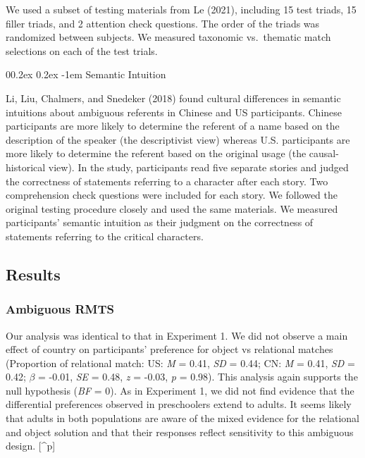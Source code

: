 \documentclass[
  man]{apa6}
\makeatletter
\let\oldparagraph\paragraph
\renewcommand{\paragraph}[1]{\oldparagraph{#1}\mbox{}}
\renewcommand{\paragraph}{\@startsection{paragraph}{4}{\parindent}%
  {0\baselineskip \@plus 0.2ex \@minus 0.2ex}%
  {-1em}%
  {\normalfont\normalsize\bfseries\itshape\typesectitle}}
\makeatother
\begin{document}
We used a subset of testing materials from Le (2021), including 15 test triads, 15 filler triads, and 2 attention check questions. The order of the triads was randomized between subjects. We measured taxonomic vs.~thematic match selections on each of the test trials.

\hypertarget{semantic-intuition}{%
\paragraph{Semantic Intuition}\label{semantic-intuition}}

Li, Liu, Chalmers, and Snedeker (2018) found cultural differences in semantic intuitions about ambiguous referents in Chinese and US participants. Chinese participants are more likely to determine the referent of a name based on the description of the speaker (the descriptivist view) whereas U.S. participants are more likely to determine the referent based on the original usage (the causal-historical view). In the study, participants read five separate stories and judged the correctness of statements referring to a character after each story. Two comprehension check questions were included for each story. We followed the original testing procedure closely and used the same materials. We measured participants' semantic intuition as their judgment on the correctness of statements referring to the critical characters.

\hypertarget{results-1}{%
\subsection{Results}\label{results-1}}

\hypertarget{ambiguous-rmts}{%
\subsubsection{Ambiguous RMTS}\label{ambiguous-rmts}}

Our analysis was identical to that in Experiment 1. We did not observe a main effect of country on participants' preference for object vs relational matches (Proportion of relational match: US: \emph{M} = 0.41, \emph{SD} = 0.44; CN: \emph{M} = 0.41, \emph{SD} = 0.42; \(\beta\) = -0.01, \emph{SE} = 0.48, \emph{z} = -0.03, \emph{p} = 0.98). This analysis again supports the null hypothesis (\emph{BF} = 0). As in Experiment 1, we did not find evidence that the differential preferences observed in preschoolers extend to adults. It seems likely that adults in both populations are aware of the mixed evidence for the relational and object solution and that their responses reflect sensitivity to this ambiguous design. {[}\^{}p{]}
\end{document}
